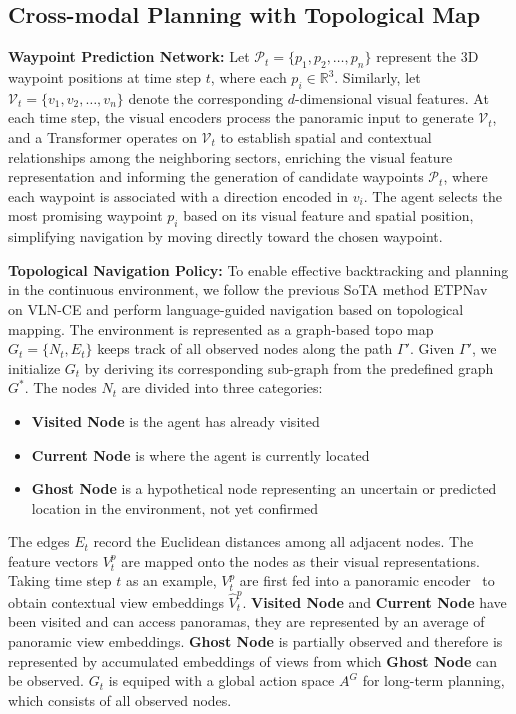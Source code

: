 \subsection{Cross-modal Planning with Topological Map}
\noindent\textbf{Waypoint Prediction Network:} Let \( \mathcal{P}_t = \{p_1, p_2, \dots, p_n\} \) represent the 3D waypoint positions at time step \( t \), where each \( p_i \in \mathbb{R}^3 \). Similarly, let \( \mathcal{V}_t = \{v_1, v_2, \dots, v_n\} \) denote the corresponding \( d \)-dimensional visual features. At each time step, the visual encoders process the panoramic input to generate \( \mathcal{V}_t \), and a Transformer operates on \( \mathcal{V}_t \) to establish spatial and contextual relationships among the neighboring sectors, enriching the visual feature representation and informing the generation of candidate waypoints \( \mathcal{P}_t \), where each waypoint is associated with a direction encoded in \( v_i \). The agent selects the most promising waypoint \( p_i \) based on its visual feature and spatial position, simplifying navigation by moving directly toward the chosen waypoint.

\noindent\textbf{Topological Navigation Policy:} To enable effective backtracking and planning in the continuous environment, we follow the previous SoTA method ETPNav~\cite{an2024etpnav} on VLN-CE and perform language-guided navigation based on topological mapping. The environment is represented as a graph-based topo map $G_t = \{N_t, E_t\}$ keeps track of all observed nodes along the path $\Gamma'$. Given $\Gamma'$, we initialize $G_t$ by deriving its corresponding sub-graph from the predefined graph $G^*$. The nodes $N_t$ are divided into three categories: 

\begin{itemize}
    \item \textbf{Visited Node} is the agent has already visited
    \item \textbf{Current Node} is where the agent is currently located
    \item \textbf{Ghost Node} is a hypothetical node representing an uncertain or predicted location in the environment, not yet confirmed
    
\end{itemize}

The edges $E_t$ record the Euclidean distances among all adjacent nodes. The feature vectors $V^p_t$ are mapped onto the nodes as their visual representations. Taking time step $t$ as an example, $V^p_t$ are first fed into a panoramic encoder~\cite{an2023etpnav} to obtain contextual view embeddings $\hat{V}^p_t$. \textbf{Visited Node} and \textbf{Current Node} have been visited and can access panoramas, they are represented by an average of panoramic view embeddings. \textbf{Ghost Node} is partially observed and therefore is represented by accumulated embeddings of views from which \textbf{Ghost Node} can be observed. $G_t$ is equiped with a global action space $A^G$ for long-term planning, which consists of all observed nodes.

